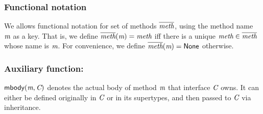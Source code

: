 \subsubsection{Functional notation}
We allows functional notation for set of methods $\overline{\textit{meth}}$, using the method name $\textit{m}$ as a key.
That is, we define $\overline{\textit{meth}}(\textit{m})=\textit{meth}$ iff there is a unique $\textit{meth}\in\overline{\textit{meth}}$ whose name is $\textit{m}$.
For convenience, we define $\overline{\textit{meth}}(\textit{m})=\textsf{None}$ otherwise.

\subsubsection{Auxiliary function:\mBody}

$\textsf{mbody}(\textit{m},\textit{C})$ denotes the actual body of method $\textit{m}$ that interface $\textit{C}$ owns. It can either be defined originally in $\textit{C}$ or in its supertypes, and then passed to $\textit{C}$ via inheritance.

